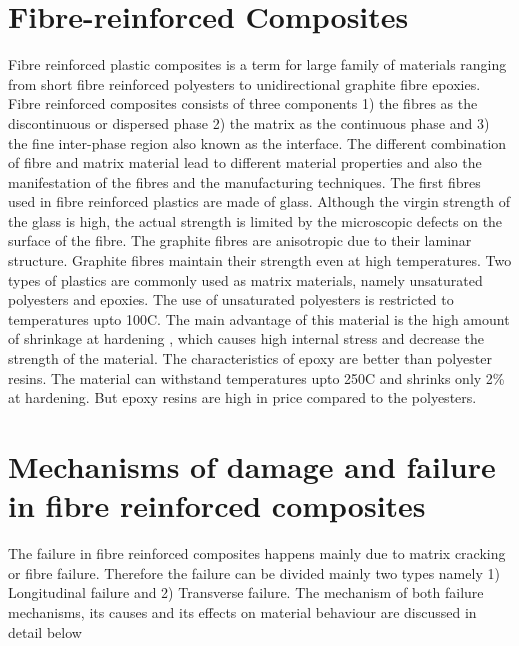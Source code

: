 \documentclass[a4paper,12pt,twoside]{report}
\begin{document}
\section{Fibre-reinforced Composites}
\indent\indent\indent  Fibre reinforced plastic composites is a term for large family of materials ranging from short fibre reinforced polyesters to unidirectional graphite fibre epoxies. Fibre reinforced composites consists of three components 1) the fibres as the discontinuous or dispersed phase 2) the matrix as the continuous phase and 3) the fine inter-phase region also known as the interface. The different combination of fibre and matrix material lead to different material properties and also the manifestation of the fibres and the manufacturing techniques. The first fibres used in fibre reinforced plastics are made of glass. Although the virgin strength of the glass is high, the actual strength is limited by the microscopic defects on the surface of the fibre. The graphite fibres are anisotropic due to their laminar structure. Graphite fibres maintain their strength even at high temperatures. Two types of plastics are commonly used as matrix materials, namely unsaturated polyesters and epoxies. The use of unsaturated polyesters is restricted to temperatures upto 100C. The main advantage of this material is the high amount of shrinkage at hardening , which causes high internal stress and decrease the strength of the material.  The characteristics of epoxy are better than polyester resins. The material can withstand temperatures upto 250C and shrinks only  2\%  at hardening. But epoxy resins are high in price compared to the polyesters.

\section{Mechanisms of damage and failure in fibre reinforced composites}
\indent\indent\indent The failure in fibre reinforced composites happens mainly due to matrix cracking or fibre failure. Therefore the failure can be divided mainly two types namely 1) Longitudinal failure and 2) Transverse failure. The mechanism of both failure mechanisms, its causes and its effects on material behaviour are discussed in detail below
\end{document}
